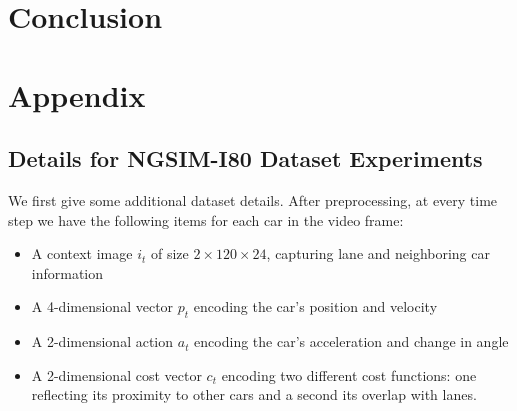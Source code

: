 \documentclass{article}
\begin{document}
\section{Conclusion}









%
%
%
%
%
%





\section{Appendix}


\subsection{Details for NGSIM-I80 Dataset Experiments}

We first give some additional dataset details.
After preprocessing, at every time step we have the following items for each car in the video frame:


\begin{itemize}
\item A context image $i_t$ of size $2 \times 120 \times 24$, capturing lane and neighboring car information
\item A 4-dimensional vector $p_t$ encoding the car's position and velocity
\item A 2-dimensional action $a_t$ encoding the car's acceleration and change in angle
\item A 2-dimensional cost vector $c_t$ encoding two different cost functions: one reflecting its proximity to other cars and a second its overlap with lanes.
\end{itemize}
\end{document}
